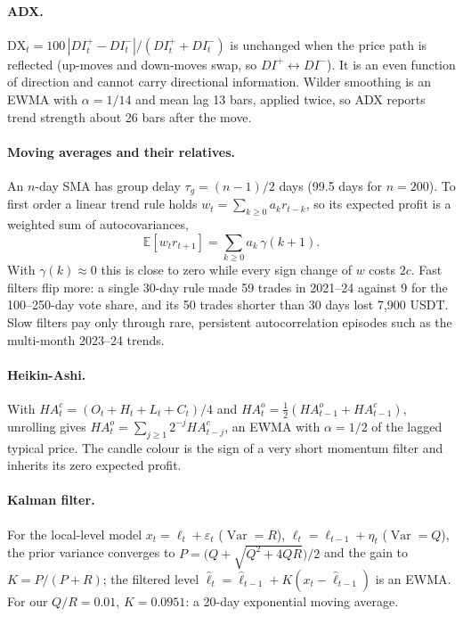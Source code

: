\documentclass[11pt,a4paper]{article}
\theoremstyle{definition}
\begin{document}
\paragraph{ADX.} $\mathrm{DX}_t=100\,|DI^+_t-DI^-_t|/(DI^+_t+DI^-_t)$ is unchanged when the price path is reflected (up-moves and down-moves swap, so $DI^+\leftrightarrow DI^-$). It is an even function of direction and cannot carry directional information. Wilder smoothing is an EWMA with $\alpha=1/14$ and mean lag 13 bars, applied twice, so ADX reports trend strength about 26 bars after the move.

\paragraph{Moving averages and their relatives.} An $n$-day SMA has group delay $\tau_g=(n-1)/2$ days (99.5 days for $n=200$). To first order a linear trend rule holds $w_t=\sum_{k\ge0}a_kr_{t-k}$, so its expected profit is a weighted sum of autocovariances,
\begin{equation}
\mathbb E[w_tr_{t+1}]=\sum_{k\ge0}a_k\,\gamma(k+1).
\end{equation}
With $\gamma(k)\approx0$ this is close to zero while every sign change of $w$ costs $2c$. Fast filters flip more: a single 30-day rule made 59 trades in 2021--24 against 9 for the 100--250-day vote share, and its 50 trades shorter than 30 days lost 7{,}900 USDT. Slow filters pay only through rare, persistent autocorrelation episodes such as the multi-month 2023--24 trends.

\paragraph{Heikin-Ashi.} With $HA^c_t=(O_t+H_t+L_t+C_t)/4$ and $HA^o_t=\tfrac12(HA^o_{t-1}+HA^c_{t-1})$, unrolling gives $HA^o_t=\sum_{j\ge1}2^{-j}HA^c_{t-j}$, an EWMA with $\alpha=1/2$ of the lagged typical price. The candle colour is the sign of a very short momentum filter and inherits its zero expected profit.

\paragraph{Kalman filter.} For the local-level model $x_t=\ell_t+\varepsilon_t$ ($\operatorname{Var}=R$), $\ell_t=\ell_{t-1}+\eta_t$ ($\operatorname{Var}=Q$), the prior variance converges to $P=\bigl(Q+\sqrt{Q^2+4QR}\bigr)/2$ and the gain to $K=P/(P+R)$; the filtered level $\hat\ell_t=\hat\ell_{t-1}+K(x_t-\hat\ell_{t-1})$ is an EWMA. For our $Q/R=0.01$, $K=0.0951$: a 20-day exponential moving average.
\end{document}
